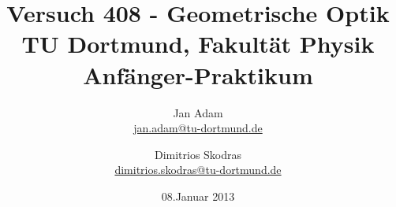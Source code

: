 



\title{Versuch 408 - Geometrische Optik\\				%
\large TU Dortmund, Fakultät Physik\\ 
\normalsize Anfänger-Praktikum}

\author{Jan Adam\\			%
{\small \href{jan.adam@tu-dortmund.de}{jan.adam@tu-dortmund.de}}	%
\and						%
Dimitrios Skodras\\					%
{\small \href{dimitrios.skodras@tu-dortmund.de}{dimitrios.skodras@tu-dortmund.de}}		%
}
\date{08.Januar 2013}				%





\maketitle					%
\thispagestyle{empty} 				%



\tableofcontents


\newpage					%


